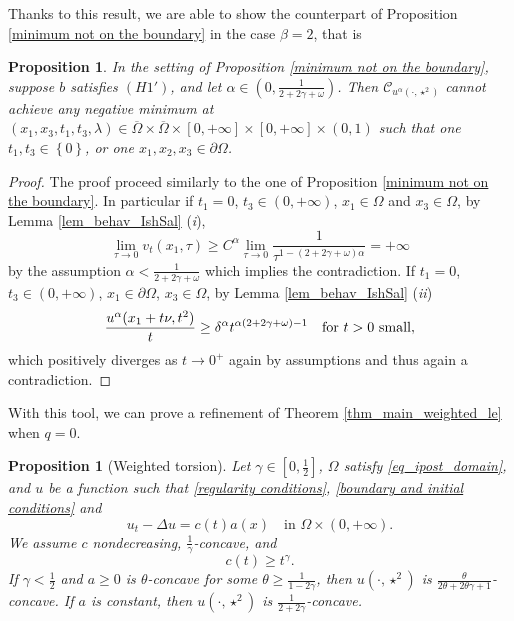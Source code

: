 \documentclass[11pt, reqno]{amsart}
\newtheorem{proposition}[lemma]{Proposition}
\theoremstyle{definition}
\numberwithin{equation}{section}
\newcommand{\Omegabar}{\overline{\Omega}}
\begin{document}
Thanks to this result, we are able to show the counterpart of Proposition \ref{minimum not on the boundary} in the case $\beta=2$, that is

\begin{proposition}
In the setting of Proposition \ref{minimum not on the boundary}, 
suppose $b$ satisfies \hyperlink{H1'}{\( (H1') \)}, and let $\alpha \in (0, \frac{1}{2+2\gamma+\omega})$.
Then $\mathcal{C}_{u^\alpha(\cdot, \star^{2})}$ cannot achieve any negative minimum at $(x_1,x_3,t_1,t_3,\lambda)\in \Omegabar \times \Omegabar \times [0,+\infty]\times [0,+\infty]\times (0,1) $ such that one $t_1,t_3\in \left\{0\right\}$, or one $x_1,x_2,x_3\in \partial \Omega$.
\end{proposition}

\begin{proof}
The proof proceed similarly to the one of Proposition \ref{minimum not on the boundary}. 
In particular if $t_1=0$, $t_3\in (0,+\infty)$, $x_1\in \Omega$ and $x_3\in \Omega $,  by Lemma \ref{lem_behav_IshSal} (\textit{i}),
	$$\lim_{\tau \to 0} v_t(x_1,\tau)\geq C^{\alpha} \lim_{\tau \to 0} \frac{1}{\tau^{1-(2+2\gamma +\omega)\alpha 	}} = +\infty$$
	by the assumption $\alpha < \frac{1}{2+2\gamma+\omega}$ which implies the contradiction.
If $t_1=0$, $t_3\in (0,+\infty)$, $x_1\in \partial \Omega$, $x_3 \in \Omega$, by Lemma \ref{lem_behav_IshSal} (\textit{ii})
	$$\frac{u^\alpha(x_1 +t\nu , t^{2})}{t}\geq \delta^\alpha t^{\alpha(2+2\gamma+\omega)-1}\quad \hbox{for $t>0$ small},$$
which positively diverges as $t\to 0^+$ again by assumptions and thus again a contradiction.
\end{proof}

With this tool, we can prove a refinement of Theorem \ref{thm_main_weighted_le} when $q=0$.

\begin{proposition}[Weighted torsion]
\label{prop_weight_tors}
	Let $\gamma \in [0,\frac{1}{2}]$, $\Omega$ satisfy \eqref{eq_ipost_domain}, and $u$ be a function such that \eqref{regularity conditions}, \eqref{boundary and initial conditions} and
	$$	u_t-\Delta u= c(t) a(x) \quad\text{in }\Omega\times (0,+\infty).$$
	We assume $c$ nondecreasing, $\frac{1}{\gamma}$-concave, and
$$c(t) \geq t^{\gamma}.$$
If $\gamma<\frac{1}{2}$ and $a\geq 0$ is $\theta$-concave for some $\theta\geq \frac{1}{1-2\gamma}$, then $u(\cdot, \star^2)$ is $\frac{\theta}{2\theta+2\theta \gamma +1}$-concave. 
If $a$ is constant, then $u(\cdot, \star^{2})$ is $\frac{1}{2+2 \gamma }$-concave.
\end{proposition}
\end{document}
